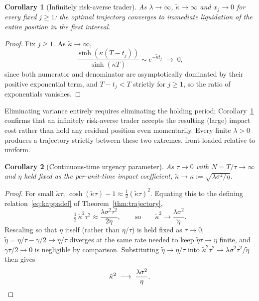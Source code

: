 \documentclass[11pt]{article}
\newtheorem{corollary}{Corollary}
\theoremstyle{remark}
\theoremstyle{definition}
\begin{document}
\begin{corollary}[Infinitely risk-averse trader]
\label{cor:riskaverse}
As $\lambda\to\infty$, $\tilde\kappa\to\infty$ and $x_j\to0$ for every fixed $j\ge1$: the optimal trajectory converges to immediate liquidation of the entire position in the first interval.
\end{corollary}
\begin{proof}
Fix $j\ge1$. As $\tilde\kappa\to\infty$,
\begin{equation*}
\frac{\sinh(\tilde\kappa(T-t_j))}{\sinh(\tilde\kappa T)} \sim e^{-\tilde\kappa t_j} \;\longrightarrow\; 0,
\end{equation*}
since both numerator and denominator are asymptotically dominated by their positive exponential term, and $T-t_j<T$ strictly for $j\ge1$, so the ratio of exponentials vanishes.
\end{proof}

Eliminating variance entirely requires eliminating the holding period; Corollary~\ref{cor:riskaverse} confirms that an infinitely risk-averse trader accepts the resulting (large) impact cost rather than hold any residual position even momentarily. Every finite $\lambda>0$ produces a trajectory strictly between these two extremes, front-loaded relative to uniform.

\begin{corollary}[Continuous-time urgency parameter]
\label{cor:continuum}
As $\tau\to0$ with $N=T/\tau\to\infty$ and $\eta$ held fixed as the per-unit-time impact coefficient, $\tilde\kappa \to \kappa := \sqrt{\lambda\sigma^2/\eta}$.
\end{corollary}
\begin{proof}
For small $\tilde\kappa\tau$, $\cosh(\tilde\kappa\tau) - 1 \approx \tfrac12(\tilde\kappa\tau)^2$. Equating this to the defining relation~\eqref{eq:kappadef} of Theorem~\ref{thm:trajectory},
\begin{equation*}
\tfrac12\,\tilde\kappa^2\tau^2 \approx \frac{\lambda\sigma^2\tau^2}{2\tilde\eta},
\qquad\text{so}\qquad
\tilde\kappa^2\to\frac{\lambda\sigma^2}{\tilde\eta}.
\end{equation*}
Rescaling so that $\eta$ itself (rather than $\eta/\tau$) is held fixed as $\tau\to0$, $\tilde\eta=\eta/\tau-\gamma/2\to\eta/\tau$ diverges at the same rate needed to keep $\tilde\eta\tau\to\eta$ finite, and $\gamma\tau/2\to0$ is negligible by comparison. Substituting $\tilde\eta\to\eta/\tau$ into $\tilde\kappa^2\tau^2\to\lambda\sigma^2\tau^2/\tilde\eta$ then gives
\begin{equation*}
\tilde\kappa^2 \;\longrightarrow\; \frac{\lambda\sigma^2}{\eta}. \qedhere
\end{equation*}
\end{proof}
\end{document}
